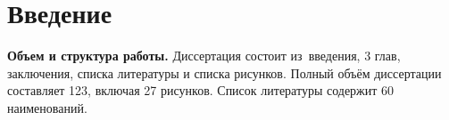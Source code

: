 \chapter*{Введение}                         %

\newcommand{\actuality}{{\textbf\actualityTXT}}
\newcommand{\progress}{}
\newcommand{\aim}{{\textbf\aimTXT}}
\newcommand{\tasks}{\textbf{\tasksTXT}}
\newcommand{\novelty}{\textbf{\noveltyTXT}}
\newcommand{\influence}{\textbf{\influenceTXT}}
\newcommand{\methods}{\textbf{\methodsTXT}}
\newcommand{\defpositions}{\textbf{\defpositionsTXT}}
\newcommand{\reliability}{\textbf{\reliabilityTXT}}
\newcommand{\probation}{\textbf{\probationTXT}}
\newcommand{\contribution}{\textbf{\contributionTXT}}
\newcommand{\publications}{\textbf{\publicationsTXT}}




\textbf{Объем и структура работы.} Диссертация состоит из~введения, 
3 глав, заключения, списка литературы и списка рисунков.
Полный объём диссертации составляет
123, включая
27 рисунков.
Список литературы содержит
60 наименований.


